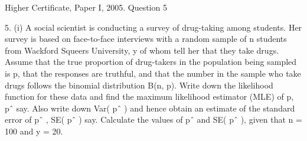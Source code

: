 \documentclass[a4paper,12pt]{article}
\begin{document}
Higher Certificate, Paper I, 2005. Question 5

\begin{framed}
5. (i) A social scientist is conducting a survey of drug-taking among students. Her
survey is based on face-to-face interviews with a random sample of n students
from Wackford Squeers University, y of whom tell her that they take drugs.
Assume that the true proportion of drug-takers in the population being sampled
is p, that the responses are truthful, and that the number in the sample who take
drugs follows the binomial distribution B(n, p). Write down the likelihood
function for these data and find the maximum likelihood estimator (MLE) of p,
pˆ say. Also write down Var( pˆ ) and hence obtain an estimate of the standard
error of pˆ , SE( pˆ ) say. Calculate the values of pˆ and SE( pˆ ), given that
n = 100 and y = 20.
\end{framed}
\end{document}
